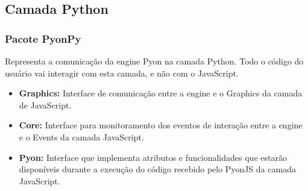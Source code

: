 \subsection{Camada Python}

\subsubsection{Pacote PyonPy}

Representa a comunicação da engine Pyon na camada Python. Todo o código do usuário vai interagir com esta camada, e não com o JavaScript. 

\begin{itemize}
    \item \textbf{Graphics:} Interface de comunicação entre a engine e o Graphics da camada de JavaScript.
    \item \textbf{Core:} Interface para monitoramento dos eventos de interação entre a engine e o Events da camada JavaScript.
    \item \textbf{Pyon:} Interface que implementa atributos e funcionalidades que estarão disponíveis durante a execução do código recebido pelo PyonJS da camada JavaScript.
\end{itemize}
